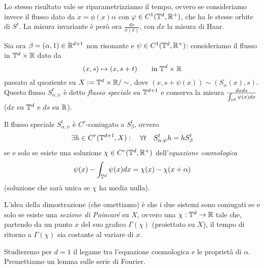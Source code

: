 Lo stesso risultato vale se riparametrizziamo il tempo, ovvero se consideriamo invece il flusso dato da $\dot x=\phi(x)\alpha$ con $\varphi\in C^1(\mathbb{T}^d,\mathbb{R}^+)$, 
che ha le stesse orbite di $S^t$. La misura invariante è però ora $\frac{dx}{\phi(x)}$, con $dx$ la misura di Haar.

Sia ora $\beta=(\alpha,1)\in \mathbb{R}^{d+1}$ non risonante e $\psi\in C^1(\mathbb{T}^d,\mathbb{R}^+)$: consideriamo il flusso in $\mathbb{T}^d\times\mathbb{R}$ dato da 
\[(x,s)\mapsto(x,s+t) \qquad \mbox{in }\mathbb{T}^d\times \mathbb{R}\]
passato al quoziente su $X:=\mathbb{T}^d\times\mathbb{R}/\sim$, dove $(x,s+\psi(x))\sim (S_\alpha(x),s)$. Questo flusso $S^t_{\alpha,\psi}$ è detto \emph{flusso speciale} su $\mathbb{T}^{d+1}$ 
e conserva la misura $\frac{dxds}{\int_{\mathbb{T}^d}\psi(x)dx}$ ($dx$ su $\mathbb{T}^d$ e $ds$ su $\mathbb{R}$).

\begin{teo}Il flusso speciale $S^t_{\alpha,\psi}$ è $C^r$-coniugato a $S^t_\beta$, ovvero
 \[\exists h\in C^r(\mathbb{T}^{d+1},X):\quad \forall t \quad S^t_{\alpha,\psi}h=hS^t_\beta\]
 se e solo se esiste una soluzione $\chi\in C^r(\mathbb{T}^d,\mathbb{R}^+)$ dell'\emph{equazione coomologica}
 \[\psi(x)-\int_{\mathbb{T}^d}\psi(x)dx=\chi(x)-\chi(x+\alpha)\]
 (soluzione che sarà unica se $\chi$ ha media nulla).
\end{teo}

L'idea della dimostrazione (che omettiamo) è che i due sistemi sono coniugati se e solo se esiste una \emph{sezione di Poincaré} su $X$,
ovvero una $\chi:\mathbb{T}^d\to\mathbb{R}$ tale che, partendo da un punto $x$ del suo grafico $\Gamma(\chi)$ (proiettato su $X$), il tempo di ritorno a $\Gamma(\chi)$
sia costante al variare di $x$.

Studieremo per $d=1$ il legame tra l'equazione coomologica e le proprietà di $\alpha$. Premettiamo un lemma sulle serie di Fourier.


